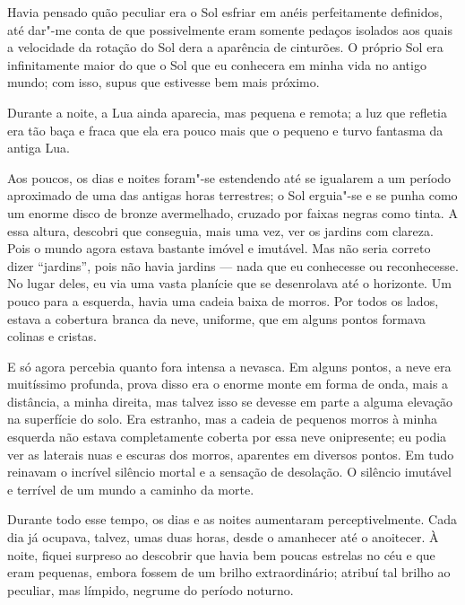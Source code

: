 Havia pensado quão peculiar era o Sol esfriar em anéis perfeitamente definidos, até dar"-me conta de que possivelmente
eram somente pedaços isolados aos quais a velocidade da rotação do Sol dera a aparência de cinturões. O próprio Sol era
infinitamente maior do que o Sol que eu conhecera em minha vida no antigo mundo; com isso, supus que estivesse bem
mais próximo.

Durante a noite, a Lua ainda aparecia, mas pequena e remota; a luz que refletia era
tão baça e fraca que ela era pouco mais que o pequeno e turvo fantasma da antiga Lua.

Aos poucos, os dias e noites foram"-se estendendo até se igualarem a um período aproximado de uma das antigas horas
terrestres; o Sol erguia"-se e se punha como um enorme disco de bronze avermelhado, cruzado por faixas negras como
tinta. A essa altura, descobri que conseguia, mais uma vez, ver os jardins com clareza. Pois o mundo agora estava
bastante imóvel e imutável. Mas não seria correto dizer ``jardins'', pois não havia jardins --- nada que eu conhecesse ou
reconhecesse. No lugar deles, eu via uma vasta planície que se desenrolava até o horizonte. Um pouco para a esquerda,
havia uma cadeia baixa de morros. Por todos os lados, estava a cobertura branca da neve, uniforme, que em alguns pontos
formava colinas e cristas.

E só agora percebia quanto fora intensa a nevasca. Em alguns pontos, a neve era muitíssimo profunda, prova
disso era o enorme monte em forma de onda, mais a distância, a minha direita, mas talvez isso se devesse em parte a alguma
elevação na superfície do solo. Era estranho, mas a cadeia de pequenos morros à minha esquerda não estava completamente
coberta por essa neve onipresente; eu podia ver as laterais nuas e escuras dos morros, aparentes em diversos pontos. Em
tudo reinavam o incrível silêncio mortal e a sensação de desolação. O silêncio imutável e terrível de um mundo a
caminho da morte.

Durante todo esse tempo, os dias e as noites aumentaram perceptivelmente. Cada dia já ocupava, talvez, umas duas horas,
desde o amanhecer até o anoitecer. À noite, fiquei surpreso ao descobrir que havia bem poucas estrelas no céu e que
eram pequenas, embora fossem de um brilho extraordinário; atribuí tal brilho ao peculiar, mas límpido, negrume do
período noturno.

